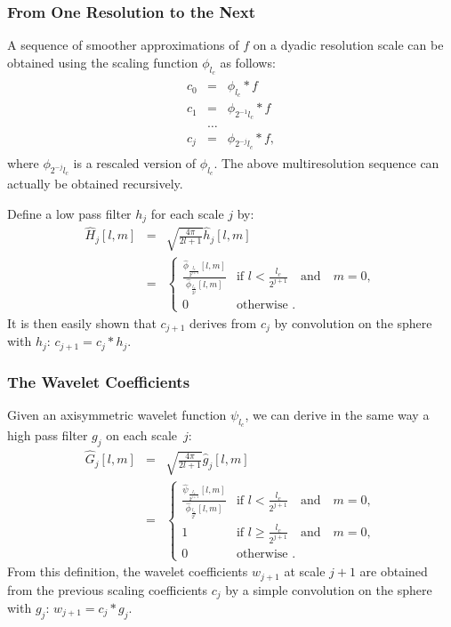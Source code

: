 \subsubsection{From One Resolution to the Next}

A sequence of smoother approximations of $f$ on a dyadic resolution scale can be obtained using the scaling function ${\phi}_{l_c}$ as follows:
\begin{eqnarray}
\begin{split}
c_0   & = &  {\phi}_{ l_{c} }  \ast f        \\
c_1   & = &  {\phi}_{2^{-1} l_{c} }   \ast f    	   \\
&\ldots&\\ 
c_j    &=&   {\phi}_{2^{-j}  l_{c}  }  \ast f  ,
\end{split}
\end{eqnarray}
where ${\phi}_{2^{-j} l_{c} }$ is a rescaled version of ${\phi}_{l_{c}}$. The above multiresolution sequence can actually  be obtained recursively. 

Define a low pass filter $h_{j}$ for each scale $j$  by:
\begin{eqnarray}
 \widehat{H}_{j}[l,m]  & = & \sqrt{\frac{4\pi}{2l+1} }  \hat h_{j}[l,m]   \nonumber  \\
   &  = & 
   \begin{cases}
   \frac {   \hat \phi_{\frac{l_{c}}{2^{j+1}} }[l,m]   }   {  \hat  \phi_{  \frac{l_{c}}{2^{j}} }[l,m]   } & \mbox{if }  l  < \frac{ l_{c}} {2^{j+1}} \quad \textrm{and}\quad m = 0 , \\
   0 & \mbox{otherwise } . 
  \end{cases}
\end{eqnarray}
It is then easily shown that $c_{j+1}$ derives from $c_j$ by convolution on the sphere with $h_j$:  $c_{j+1} = c_{j} \ast h_j$.


\subsubsection{The Wavelet Coefficients}

Given an axisymmetric  wavelet function $\psi_{l_c}$, we can derive in the same way a 
high pass filter $g_j$ on each scale~$j$:
\begin{eqnarray}
 \widehat{G}_{j}[l,m]  & = & \sqrt{\frac{4\pi}{2l+1} }  \hat{g}_{j}[l,m] \nonumber  \\
   & = & 
  \begin{cases}
  \frac {   \hat \psi_{\frac{l_{c}}{2^{j+1}} }[l,m]   }   {  \hat  \phi_{  \frac{l_{c}}{2^{j}} }[l,m]   } & \mbox{if }  l  < \frac{ l_{c}} {2^{j+1}} \quad \textrm{and}\quad m = 0 ,\\
1 &\mbox{if }  l  \ge \frac{ l_{c}} {2^{j+1}} \quad \textrm{and}\quad m = 0 ,\\ 
0&  \mbox{otherwise } .
  \end{cases}
\end{eqnarray}
From this definition, the wavelet coefficients $w_{j+1} $ at scale $j+1$ are obtained from the previous scaling coefficients $c_j$ 
by a simple convolution on the sphere with $g_j$: $w_{j+1} = c_{j} \ast g_j$.


